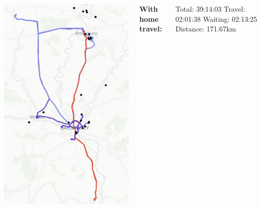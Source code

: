 \documentclass[usenames,dvipsnames]{beamer}
\begin{document}
\begin{frame}
\begin{columns}
\begin{minipage}[c][0.05\textheight][c]{\linewidth}
		\end{minipage}
		\begin{minipage}[c][0.7\textheight][c]{\linewidth}
			\centering
			\includegraphics[width=0.7\linewidth]{figures/nurseSalisbury}
		\end{minipage}
		\begin{minipage}[c][0.2\textheight][c]{\linewidth}
			\scriptsize
			\hspace{17mm}\textbf{With home travel:}
			\begin{itemize}
				\setlength{\itemindent}{0.5in}
				\setlength\itemsep{-0.2em}
				\ditem Total: 39:14:03
				\ditem Travel: 02:01:38
				\ditem Waiting: 02:13:25
				\ditem Distance: 171.67km
			\end{itemize}
		\end{minipage}
	\end{columns}
\end{frame}
\end{document}
